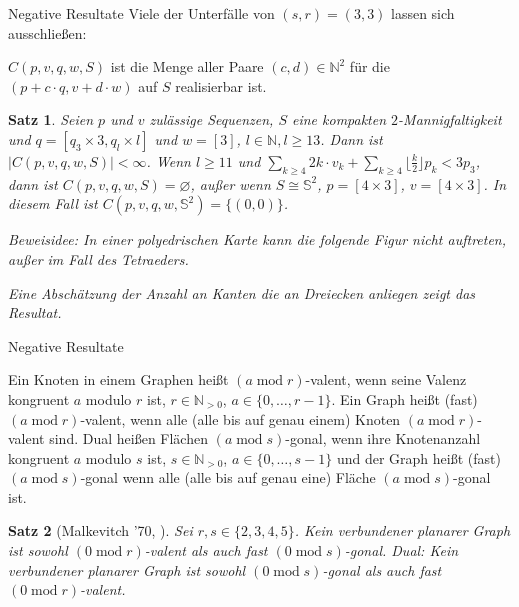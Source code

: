 \documentclass[10pt, notheorems]{beamer}
\newtheorem{theorem}{Satz}[section]
\let\emptyset\varnothing
\newcommand{\set}[1]{\{ #1 \}}
\newcommand{\nats}{\mathbb{N}}
\newcommand{\sphere}{\mathbb{S}}
\renewcommand{\mod}{\operatorname{mod}}
\newcommand{\hdef}[1]{\textcolor{darkred2}{#1}}
\begin{document}
\begin{frame}{Negative Resultate}
  Viele der Unterfälle von $(s, r) = (3, 3)$ lassen sich ausschließen:
  \begin{definition}
    \hdef{$C(p, v, q, w, S)$} ist die Menge aller Paare $(c, d) \in \nats^2$ für die $(p + c \cdot q, v + d \cdot w)$ auf $S$ realisierbar ist.
  \end{definition}
  \pause
  \begin{theorem}
    Seien  $p$ und $v$ zulässige Sequenzen, $S$ eine kompakten $2$-Mannigfaltigkeit und $q = [q_3 \times 3, q_l \times l]$ und $w = [3]$, $l \in \nats, l \geq 13$. Dann ist $|C(p, v, q, w, S)| < \infty$. Wenn $l \geq 11$ und $\sum_{k \geq 4} 2k \cdot v_k + \sum_{k \geq 4} \lfloor \tfrac{k}{2} \rfloor p_k < 3p_3$, dann ist $C(p, v, q, w, S) = \emptyset$, außer wenn $S \cong \sphere^2$, $p = [4 \times 3]$, $v = [4 \times 3]$. In diesem Fall ist $C(p, v, q, w, \sphere^2) = \set{(0, 0)}$.

  \pause
    Beweisidee: In einer polyedrischen Karte kann die folgende Figur nicht auftreten, außer im Fall des Tetraeders.

    { \centering
      \par
    }
    Eine Abschätzung der Anzahl an Kanten die an Dreiecken anliegen zeigt das Resultat.
  \end{theorem}
\end{frame}

\begin{frame}{Negative Resultate}
  \begin{definition} Ein Knoten in einem Graphen heißt \hdef{$(a \mod r)$-valent}, wenn seine Valenz kongruent $a$ modulo $r$ ist, $r \in \nats_{>0}$, $a \in \set{0, \dots, r - 1}$. Ein Graph heißt (fast) $(a \mod r)$-valent, wenn alle (alle bis auf genau einem) Knoten $(a \mod r)$-valent sind. Dual heißen Flächen \hdef{$(a \mod s)$-gonal}, wenn ihre Knotenanzahl kongruent $a$ modulo $s$ ist, $s \in \nats_{>0}$, $a \in \set{0, \dots, s - 1}$ und der Graph heißt (fast) $(a \mod s)$-gonal wenn alle (alle bis auf genau eine) Fläche  $(a \mod s)$-gonal ist.
  \end{definition}
  
  \begin{theorem}[Malkevitch '70, \cite{malkevitch1970properties}] Sei $r, s \in \set{2, 3, 4, 5}$. Kein verbundener planarer Graph ist sowohl $(0 \mod r)$-valent als auch fast $(0 \mod s)$-gonal. Dual: Kein verbundener planarer Graph ist sowohl $(0 \mod s)$-gonal als auch fast $(0 \mod r)$-valent.
  \end{theorem}
\end{frame}
\end{document}
